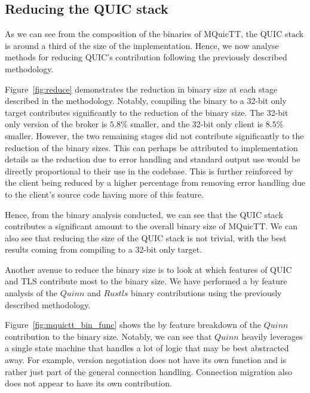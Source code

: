 \subsection{Reducing the QUIC stack}

As we can see from the composition of the binaries of MQuicTT, the QUIC stack is around a third of the size of the implementation.
Hence, we now analyse methods for reducing QUIC's contribution following the previously described methodology.

Figure~\ref{fig:reduce} demonstrates the reduction in binary size at each stage described in the methodology.
Notably, compiling the binary to a 32-bit only target contributes significantly to the reduction of the binary size.
The 32-bit only version of the broker is $5.8\%$ smaller, and the 32-bit only client is $8.5\%$ smaller.
However, the two remaining stages did not contribute significantly to the reduction of the binary sizes.
This can perhaps be attributed to implementation details as the reduction due to error handling and standard output use would be directly proportional to their use in the codebase.
This is further reinforced by the client being reduced by a higher percentage from removing error handling due to the client's source code having more of this feature.

Hence, from the binary analysis conducted, we can see that the QUIC stack contributes a significant amount to the overall binary size of MQuicTT.
We can also see that reducing the size of the QUIC stack is not trivial, with the best results coming from compiling to a 32-bit only target.

Another avenue to reduce the binary size is to look at which features of QUIC and TLS contribute most to the binary size.
We have performed a by feature analysis of the $Quinn$ and $Rustls$ binary contributions using the previously described methodology.

Figure~\ref{fig:mquictt_bin_func} shows the by feature breakdown of the $Quinn$ contribution to the binary size.
Notably, we can see that $Quinn$ heavily leverages a single state machine that handles a lot of logic that may be best abstracted away.
For example, version negotiation does not have its own function and is rather just part of the general connection handling.
Connection migration also does not appear to have its own contribution.

